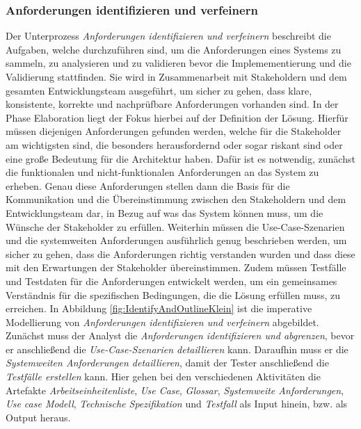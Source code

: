 \subsubsection{Anforderungen identifizieren und verfeinern}
 Der Unterprozess \textit{Anforderungen identifizieren und verfeinern} beschreibt die Aufgaben, welche durchzuführen sind, um die Anforderungen eines Systems zu sammeln, zu analysieren und zu validieren bevor die Implemementierung und die Validierung stattfinden. Sie wird in Zusammenarbeit mit Stakeholdern und dem gesamten Entwicklungsteam ausgeführt, um sicher zu gehen, dass klare, konsistente, korrekte und nachprüfbare Anforderungen vorhanden sind.\newline
 In der Phase Elaboration liegt der Fokus hierbei auf der Definition der Lösung. Hierfür müssen diejenigen Anforderungen gefunden werden, welche für die Stakeholder am wichtigsten sind, die besonders herausfordernd oder sogar riskant sind oder eine große Bedeutung für die Architektur haben.\newline
 Dafür ist es notwendig, zunächst die funktionalen und nicht-funktionalen Anforderungen an das System zu erheben. Genau diese Anforderungen stellen dann die Basis für die Kommunikation und die Übereinstimmung zwischen den Stakeholdern und dem Entwicklungsteam dar, in Bezug auf was das System können muss, um die Wünsche der Stakeholder zu erfüllen.\newline
 Weiterhin müssen die Use-Case-Szenarien und die systemweiten Anforderungen ausführlich genug beschrieben werden, um sicher zu gehen, dass die Anforderungen richtig verstanden wurden und dass diese mit den Erwartungen der Stakeholder übereinstimmen.\newline
 Zudem müssen Testfälle und Testdaten für die Anforderungen entwickelt werden, um ein gemeinsames Verständnis für die spezifischen Bedingungen, die die Lösung erfüllen muss, zu erreichen.
 In Abbildung \ref{fig:IdentifyAndOutlineKlein} ist die imperative Modellierung von \textit{Anforderungen identifizieren und verfeinern} abgebildet. \newline
 Zunächst muss der Analyst die \textit{Anforderungen identifizieren und abgrenzen}, bevor er anschließend die \textit{Use-Case-Szenarien detaillieren} kann. Daraufhin muss er die \textit{Systemweiten Anforderungen detaillieren}, damit der Tester anschließend die \textit{Testfälle erstellen} kann.\newline
 Hier gehen bei den verschiedenen Aktivitäten die Artefakte \textit{Arbeitseinheitenliste}, \textit{Use Case}, \textit{Glossar}, \textit{Systemweite Anforderungen}, \textit{Use case Modell}, \textit{Technische Spezifikation} und \textit{Testfall} als Input hinein, bzw. als Output heraus.
 
